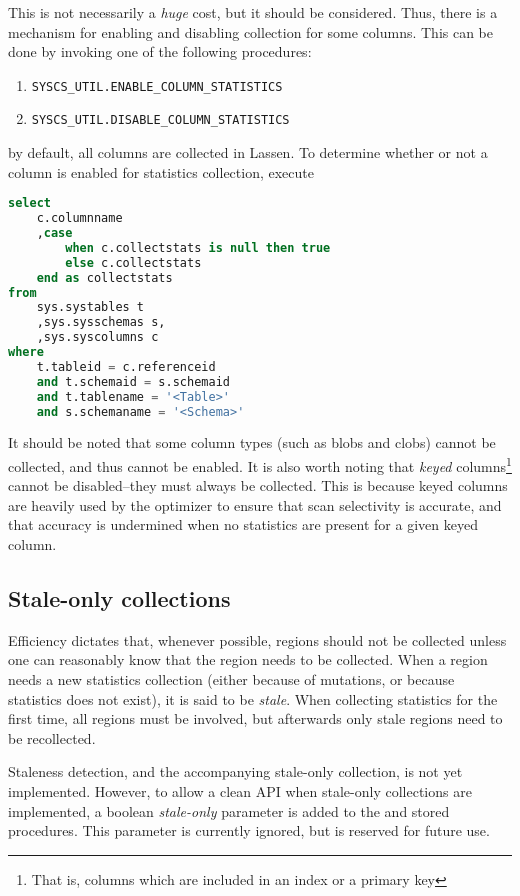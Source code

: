 This is not necessarily a \emph{huge} cost, but it should be considered. Thus, there is a mechanism for enabling and disabling collection for some columns. This can be done by invoking one of the following procedures:

\begin{enumerate}
\item \texttt{SYSCS\_UTIL.ENABLE\_COLUMN\_STATISTICS} 
\item \texttt{SYSCS\_UTIL.DISABLE\_COLUMN\_STATISTICS} 
\end{enumerate}
by default, all columns are collected in Lassen. To determine whether or not a column is enabled for statistics collection, execute
\begin{lstlisting}[frame=single,captionpos=b,caption=Determine if column has statistics enabled,language=SQL]
select
	c.columnname
	,case 
		when c.collectstats is null then true 
		else c.collectstats 
	end as collectstats
from 
	sys.systables t
	,sys.sysschemas s,
 	,sys.syscolumns c
where 
	t.tableid = c.referenceid
	and t.schemaid = s.schemaid
	and t.tablename = '<Table>'
	and s.schemaname = '<Schema>'
\end{lstlisting}

It should be noted that some column types (such as blobs and clobs) cannot be collected, and thus cannot be enabled. It is also worth noting that \emph{keyed} columns\footnote{That is, columns which are included in an index or a primary key} cannot be disabled--they must always be collected. This is because keyed columns are heavily used by the optimizer to ensure that scan selectivity is accurate, and that accuracy is undermined when no statistics are present for a given keyed column.

\subsection{Stale-only collections}
Efficiency dictates that, whenever possible, regions should not be collected unless one can reasonably know that the region needs to be collected. When a region needs a new statistics collection (either because of mutations, or because statistics does not exist), it is said to be \emph{stale}. When collecting statistics for the first time, all regions must be involved, but afterwards only stale regions need to be recollected.

Staleness detection, and the accompanying stale-only collection, is not yet implemented. However, to allow a clean API when stale-only collections are implemented, a boolean \emph{stale-only} parameter is added to the \collecttablestats and \break \collectschemastats stored procedures. This parameter is currently ignored, but is reserved for future use.

